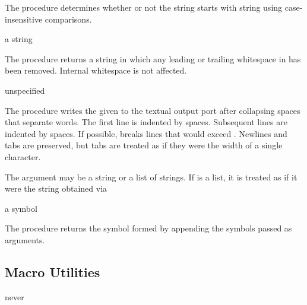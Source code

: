 The  procedure determines whether or not the
string  starts with string  using case-insensitive
comparisons.

\begin{procedure}
\end{procedure}
\returns{} a string

The  procedure returns a string in which
any leading or trailing whitespace in  has been removed.
Internal whitespace is not affected.

\begin{procedure}
\end{procedure}
\returns{} unspecified

The  procedure writes the given  to the textual output
port  after collapsing spaces that separate words. The first line is
indented by  spaces. Subsequent lines are indented by
 spaces. If possible,  breaks lines that
would exceed . Newlines and tabs are preserved, but tabs are
treated as if they were the width of a single character.

The  argument may be a string or a list of strings. If 
is a list, it is treated as if it were the string obtained via 

\begin{procedure}
\end{procedure}
\returns{} a symbol

The  procedure returns the symbol formed by
appending the symbols passed as arguments.

\subsection{Macro Utilities}

\begin{procedure}
\end{procedure}
\returns{} never

